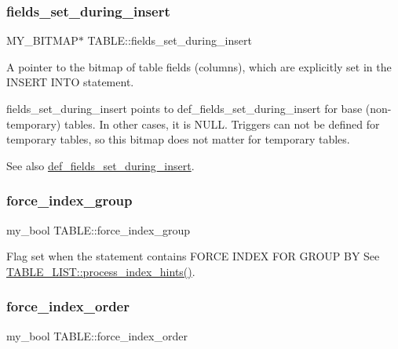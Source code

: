 \subsubsection{\texorpdfstring{fields\+\_\+set\+\_\+during\+\_\+insert}{fields\_set\_during\_insert}}
{\footnotesize\ttfamily M\+Y\+\_\+\+B\+I\+T\+M\+AP$\ast$ T\+A\+B\+L\+E\+::fields\+\_\+set\+\_\+during\+\_\+insert}

A pointer to the bitmap of table fields (columns), which are explicitly set in the I\+N\+S\+E\+RT I\+N\+TO statement.

fields\+\_\+set\+\_\+during\+\_\+insert points to def\+\_\+fields\+\_\+set\+\_\+during\+\_\+insert for base (non-\/temporary) tables. In other cases, it is N\+U\+LL. Triggers can not be defined for temporary tables, so this bitmap does not matter for temporary tables.

\begin{DoxySeeAlso}{See also}
\mbox{\hyperlink{structTABLE_adc4c495f334d7d4f3822800df766f246}{def\+\_\+fields\+\_\+set\+\_\+during\+\_\+insert}}. 
\end{DoxySeeAlso}
\mbox{\label{structTABLE_aaeda0a79564d3f6d473cd77f155e16cb}} 
\subsubsection{\texorpdfstring{force\+\_\+index\+\_\+group}{force\_index\_group}}
{\footnotesize\ttfamily my\+\_\+bool T\+A\+B\+L\+E\+::force\+\_\+index\+\_\+group}

Flag set when the statement contains F\+O\+R\+CE I\+N\+D\+EX F\+OR G\+R\+O\+UP BY See \mbox{\hyperlink{structTABLE__LIST_a088e2115774d6bc3dbc2d11d5db45a93}{T\+A\+B\+L\+E\+\_\+\+L\+I\+S\+T\+::process\+\_\+index\+\_\+hints()}}. \mbox{\label{structTABLE_a5555a069b95c932eeaa61b78313ddbf7}} 
\subsubsection{\texorpdfstring{force\+\_\+index\+\_\+order}{force\_index\_order}}
{\footnotesize\ttfamily my\+\_\+bool T\+A\+B\+L\+E\+::force\+\_\+index\+\_\+order}

